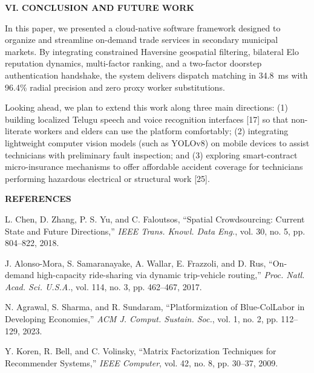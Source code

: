 \documentclass[10pt,twocolumn,a4paper]{article}
\begin{document}
\vspace{1.2em}
\noindent
\textbf{\large VI. CONCLUSION AND FUTURE WORK}

\vspace{0.5em}
In this paper, we presented a cloud-native software framework designed to organize and streamline on-demand trade services in secondary municipal markets. By integrating constrained Haversine geospatial filtering, bilateral Elo reputation dynamics, multi-factor ranking, and a two-factor doorstep authentication handshake, the system delivers dispatch matching in 34.8~ms with 96.4\% radial precision and zero proxy worker substitutions.

Looking ahead, we plan to extend this work along three main directions: (1) building localized Telugu speech and voice recognition interfaces [17] so that non-literate workers and elders can use the platform comfortably; (2) integrating lightweight computer vision models (such as YOLOv8) on mobile devices to assist technicians with preliminary fault inspection; and (3) exploring smart-contract micro-insurance mechanisms to offer affordable accident coverage for technicians performing hazardous electrical or structural work [25].

\vspace{1.2em}
\noindent
\begin{center}
\textbf{\large REFERENCES}
\end{center}

\vspace{0.5em}
\small
\noindent
[1] L. Chen, D. Zhang, P. S. Yu, and C. Faloutsos, ``Spatial Crowdsourcing: Current State and Future Directions,'' \textit{IEEE Trans. Knowl. Data Eng.}, vol. 30, no. 5, pp. 804--822, 2018.

\noindent
[2] J. Alonso-Mora, S. Samaranayake, A. Wallar, E. Frazzoli, and D. Rus, ``On-demand high-capacity ride-sharing via dynamic trip-vehicle routing,'' \textit{Proc. Natl. Acad. Sci. U.S.A.}, vol. 114, no. 3, pp. 462--467, 2017.

\noindent
[3] N. Agrawal, S. Sharma, and R. Sundaram, ``Platformization of Blue-ColLabor in Developing Economies,'' \textit{ACM J. Comput. Sustain. Soc.}, vol. 1, no. 2, pp. 112--129, 2023.

\noindent
[4] Y. Koren, R. Bell, and C. Volinsky, ``Matrix Factorization Techniques for Recommender Systems,'' \textit{IEEE Computer}, vol. 42, no. 8, pp. 30--37, 2009.
\end{document}
